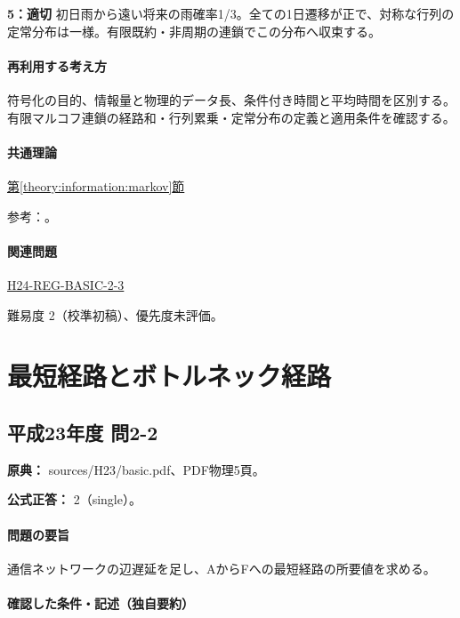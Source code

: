 \noindent\textbf{5：適切} 初日雨から遠い将来の雨確率1/3。全ての1日遷移が正で、対称な行列の定常分布は一様。有限既約・非周期の連鎖でこの分布へ収束する。\par

\paragraph{再利用する考え方} 符号化の目的、情報量と物理的データ長、条件付き時間と平均時間を区別する。有限マルコフ連鎖の経路和・行列累乗・定常分布の定義と適用条件を確認する。

\paragraph{共通理論} \hyperref[theory:information:markov]{第\ref*{theory:information:markov}節}

\par 参考：\cite{info_markov}。

\paragraph{関連問題} \hyperref[q:h24-reg-basic-2-3]{H24-REG-BASIC-2-3}

\par 難易度 2（校準初稿）、優先度未評価。

\section{最短経路とボトルネック経路}

\subsection{平成23年度 問2-2}
\label{q:h23-reg-basic-2-2}

\noindent\textbf{原典：} sources/H23/basic.pdf、PDF物理5頁。

\textbf{公式正答：} 2（single）。

\paragraph{問題の要旨} 通信ネットワークの辺遅延を足し、AからFへの最短経路の所要値を求める。

\paragraph{確認した条件・記述（独自要約）}\mbox{}\par

